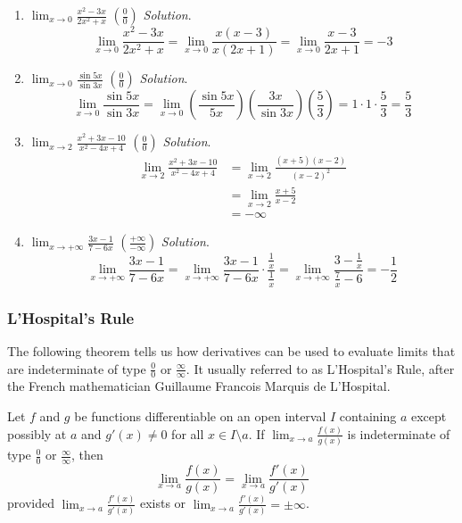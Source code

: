 \documentclass[
  letterpaper,
  DIV=11,
  numbers=noendperiod]{scrartcl}
\theoremstyle{definition}
\theoremstyle{plain}
\theoremstyle{remark}
\begin{document}
\begin{enumerate}
\def\labelenumi{\arabic{enumi}.}
\item
  \(\displaystyle\lim_{x \to 0} \frac{x^2-3x}{2x^2+x}\)
  \(\left(\frac{0}{0}\right)\) \emph{Solution}. \[
  \displaystyle\lim_{x \to 0} \frac{x^2-3x}{2x^2+x}= \displaystyle\lim_{x \to 0} \frac{x(x-3)}{x(2x+1)}=\displaystyle\lim_{x \to 0} \frac{x-3}{2x+1}=-3
  \]
\item
  \(\displaystyle\lim_{x \to 0} \frac{\sin5x}{\sin3x}\)
  \(\left(\frac{0}{0}\right)\) \emph{Solution}. \[
  \displaystyle\lim_{x \to 0} \frac{\sin5x}{\sin3x}=\displaystyle\lim_{x \to 0} \left(\frac{\sin5x}{5x}\right)\left(\frac{3x}{\sin3x}\right)\left(\frac{5}{3}\right)=1\cdot1\cdot\frac{5}{3}=\frac{5}{3}
  \]
\item
  \(\displaystyle\lim_{x \to 2} \frac{x^2+3x-10}{x^2-4x+4}\)
  \(\left(\frac{0}{0}\right)\) \emph{Solution}. \[
  \begin{aligned}
  \displaystyle\lim_{x \to 2} \frac{x^2+3x-10}{x^2-4x+4}&=\displaystyle\lim_{x \to 2}\frac{(x+5)(x-2)}{(x-2)^2}\\&=\displaystyle\lim_{x \to 2}\frac{x+5}{x-2}\\&=-\infty
  \end{aligned}
  \]
\item
  \(\displaystyle\lim_{x \to +\infty}\frac{3x-1}{7-6x}\)
  \(\left(\frac{+\infty}{-\infty}\right)\) \emph{Solution}. \[
  \displaystyle\lim_{x \to +\infty}\frac{3x-1}{7-6x}=\displaystyle\lim_{x \to +\infty}\frac{3x-1}{7-6x}\cdot \frac{\frac{1}{x}}{\frac{1}{x}}=\displaystyle\lim_{x \to +\infty}\frac{3-\frac{1}{x}}{\frac{7}{x}-6}=-\frac{1}{2}
  \]
\end{enumerate}

\hypertarget{htm:lhospitalsrule}{}
\hypertarget{lhospitals-rule}{%
\subsubsection{L'Hospital's Rule}\label{lhospitals-rule}}

The following theorem tells us how derivatives can be used to evaluate
limits that are indeterminate of type \(\frac{0}{0}\) or
\(\frac{\infty}{\infty}\). It usually referred to as L'Hospital's Rule,
after the French mathematician Guillaume Francois Marquis de L'Hospital.

\leavevmode{}%
Let \(f\) and \(g\) be functions differentiable on an open interval
\(I\) containing \(a\) except possibly at \(a\) and \(g'(x)\ne 0\) for
all \(x \in I \setminus {a}\). If
\(\displaystyle\lim_{x \to a}\frac{f(x)}{g(x)}\) is indeterminate of
type \(\frac{0}{0}\) or \(\frac{\infty}{\infty}\), then \[
\displaystyle\lim_{x \to a}\frac{f(x)}{g(x)}=\displaystyle\lim_{x \to a}\frac{f'(x)}{g'(x)}
\] provided \(\displaystyle\lim_{x \to a}\frac{f'(x)}{g'(x)}\) exists or
\(\displaystyle\lim_{x \to a}\frac{f'(x)}{g'(x)}=\pm \infty\).
\end{document}
